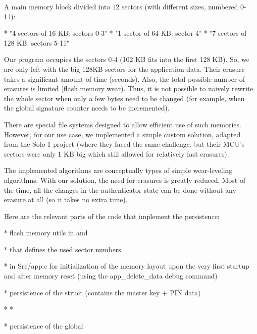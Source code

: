 A main memory block divided into 12 sectors (with different sizes, numbered 0-11):

\begitems

* "4 sectors of 16 KB: sectors 0-3"
* "1 sector of 64 KB: sector 4"
* "7 sectors of 128 KB: sectors 5-11"

\enditems

Our program occupies the sectors 0-4 (102 KB fits into the first 128 KB). So, we are only left with the big 128KB sectors for the application data. {\sbf Their erasure takes a significant amount of time} (seconds). Also, the total possible number of erasures is limited ({\sbf flash memory wear}). Thus, it is not possible to naively rewrite the whole sector when only a few bytes need to be changed (for example, when the global signature counter needs to be incremented).

There are special file systems designed to allow efficient use of such memories. However, for our use case, {\sbf we implemented a simple custom solution, adapted from the Solo 1 project} (where they faced the same challenge, but their MCU’s sectors were only 1 KB big which still allowed for relatively fast erasures).

The implemented algorithms are conceptually types of {\sbf simple wear-leveling algorithms}. With our solution, the need for erasures is greatly reduced. Most of the time, all the changes in the authenticator state can be done without any erasure at all (so it takes no extra time).

Here are the relevant parts of the code that implement the persistence:

\begitems

* flash memory utils in  and 

*  that defines the used sector numbers

*  in Src/app.c for initialization of the memory layout upon the very first startup and after memory reset (using the app_delete_data debug command)

* persistence of the  struct (contains the master key + PIN data)

\begitems
* 
* 
\enditems

* persistence of the global 

\begitems

